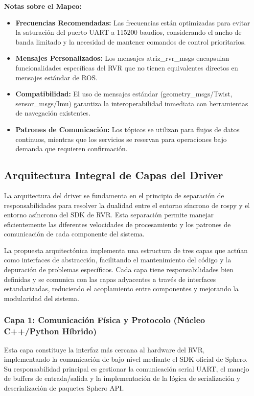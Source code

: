 \documentclass[11pt]{article}
\newcommand{\code}[1]{\textcolor{codeblue}{\url{#1}}}
\numberwithin{figure}{section}
\numberwithin{table}{section}
\def\code#1{#1}%
\begin{document}
\textbf{Notas sobre el Mapeo:}
\begin{itemize}
\item \textbf{Frecuencias Recomendadas:} Las frecuencias están optimizadas para evitar la saturación del puerto UART a 115200 baudios, considerando el ancho de banda limitado y la necesidad de mantener comandos de control prioritarios.
\item \textbf{Mensajes Personalizados:} Los mensajes \code{atriz\_rvr\_msgs} encapsulan funcionalidades específicas del RVR que no tienen equivalentes directos en mensajes estándar de ROS.
\item \textbf{Compatibilidad:} El uso de mensajes estándar (\code{geometry\_msgs/Twist}, \code{sensor\_msgs/Imu}) garantiza la interoperabilidad inmediata con herramientas de navegación existentes.
\item \textbf{Patrones de Comunicación:} Los tópicos se utilizan para flujos de datos continuos, mientras que los servicios se reservan para operaciones bajo demanda que requieren confirmación.
\end{itemize}


\subsection{Arquitectura Integral de Capas del Driver}
\label{sec:arquitectura_capas}

La arquitectura del driver se fundamenta en el principio de separación de responsabilidades para resolver la dualidad entre el entorno síncrono de rospy y el entorno asíncrono del SDK de RVR. Esta separación permite manejar eficientemente las diferentes velocidades de procesamiento y los patrones de comunicación de cada componente del sistema.

La propuesta arquitectónica implementa una estructura de tres capas que actúan como interfaces de abstracción, facilitando el mantenimiento del código y la depuración de problemas específicos. Cada capa tiene responsabilidades bien definidas y se comunica con las capas adyacentes a través de interfaces estandarizadas, reduciendo el acoplamiento entre componentes y mejorando la modularidad del sistema.


\subsubsection{Capa 1: Comunicación Física y Protocolo (Núcleo C++/Python Híbrido)}

Esta capa constituye la interfaz más cercana al hardware del RVR, implementando la comunicación de bajo nivel mediante el SDK oficial de Sphero. Su responsabilidad principal es gestionar la comunicación serial UART, el manejo de buffers de entrada/salida y la implementación de la lógica de serialización y deserialización de paquetes Sphero API.
\end{document}
